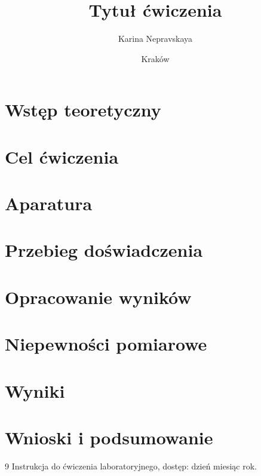 \documentclass[12pt,a4paper]{article}
\title{\textbf{Tytuł ćwiczenia}}
\author{Karina Nepravskaya}
\date{Kraków \the\year}
\begin{document}
\maketitle

\begin{abstract}
\noindent
\end{abstract}

\tableofcontents

\section{Wstęp teoretyczny}

\section{Cel ćwiczenia}

\section{Aparatura}

\section{Przebieg doświadczenia}

\section{Opracowanie wyników}

\section{Niepewności pomiarowe}

\section{Wyniki}

\section{Wnioski i podsumowanie}

\begin{thebibliography}{9}
Instrukcja do ćwiczenia laboratoryjnego, dostęp: dzień miesiąc rok.
\end{thebibliography}
\end{document}

